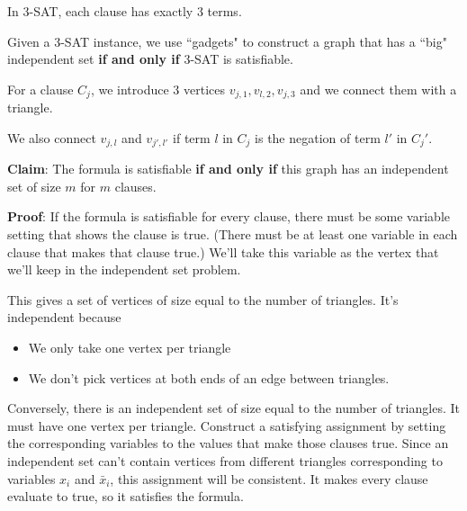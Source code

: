 \documentclass[12pt]{article}
\begin{document}
  In 3-SAT, each clause has exactly 3 terms.

  {
    Given a 3-SAT instance, we use ``gadgets" to construct a graph that has a
    ``big" independent set {\bf if and only if} 3-SAT is satisfiable.

    For a clause $C_j$, we introduce 3 vertices $v_{j, 1}, v_{l, 2}, v_{j, 3}$
    and we connect them with a triangle.

    We also connect $v_{j, l}$ and $v_{j', l'}$ if term $l$ in $C_j$ is the
    negation of term $l'$ in $C_j'$.


    {\bf Claim}: The formula is satisfiable {\bf if and only if} this graph 
    has an independent set of size $m$ for $m$ clauses.

    {\bf Proof}: If the formula is satisfiable for every clause, there must be
    some variable setting that shows the clause is true. (There must be at least
    one variable in each clause that makes that clause true.) We'll take this
    variable as the vertex that we'll keep in the independent set problem.

    This gives a set of vertices of size equal to the number of triangles. It's
    independent because 

    \begin{itemize}
      \item We only take one vertex per triangle
      \item We don't pick vertices at both ends of an edge between triangles.
    \end{itemize}


    Conversely, there is an independent set of size equal to the number of
    triangles. It must have one vertex per triangle. Construct a satisfying
    assignment by setting the corresponding variables to the values that make
    those clauses true. Since an independent set can't contain vertices from
    different triangles corresponding to variables $x_i$ and $\bar x_i$, this
    assignment will be consistent. It makes every clause evaluate to true, so it
    satisfies the formula.
  }
\end{document}
